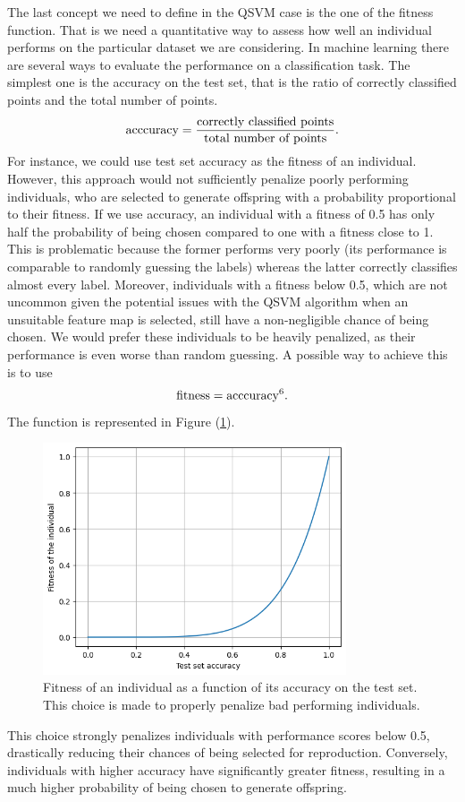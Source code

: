 \documentclass[12pt]{article}
\begin{document}
The last concept we need to define in the QSVM case is the one of the fitness function. That is we need a quantitative way to assess how well an individual performs on the particular dataset we are considering. In machine learning there are several ways to evaluate the performance on a classification task. The simplest one is the accuracy on the test set, that is the ratio of correctly classified points and the total number of points. 
\begin{equation}
    \textup{acccuracy}=\frac{\textup{correctly classified points}}{\textup{total number of points}}.
\end{equation}
For instance, we could use test set accuracy as the fitness of an individual. However, this approach would not sufficiently penalize poorly performing individuals, who are selected to generate offspring with a probability proportional to their fitness. If we use accuracy, an individual with a fitness of 0.5 has only half the probability of being chosen compared to one with a fitness close to 1. This is problematic because the former performs very poorly (its performance is comparable to randomly guessing the labels) whereas the latter correctly classifies almost every label. Moreover, individuals with a fitness below 0.5, which are not uncommon given the potential issues with the QSVM algorithm when an unsuitable feature map is selected, still have a non-negligible chance of being chosen. We would prefer these individuals to be heavily penalized, as their performance is even worse than random guessing. A possible way to achieve this is to use
\begin{equation}
    \textup{fitness}=\textup{acccuracy}^6.
    \label{accuracy}
\end{equation}
The function is represented in Figure (\ref{fig:fitness function}).
\begin{figure}[h!]
    \centering
    \includegraphics[width=0.8\textwidth]{images/sigmoid.png}
    \caption{Fitness of an individual as a function of its accuracy on the test set. This choice is made to properly penalize bad performing individuals.}
    \label{fig:fitness function}
\end{figure}
This choice strongly penalizes individuals with performance scores below 0.5, drastically reducing their chances of being selected for reproduction. Conversely, individuals with higher accuracy have significantly greater fitness, resulting in a much higher probability of being chosen to generate offspring.
\end{document}
